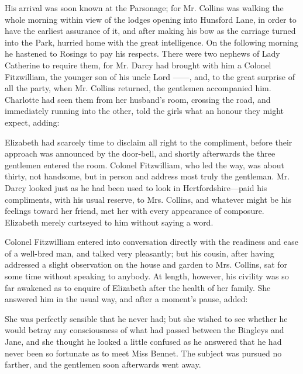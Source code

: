 His arrival was soon known at the Parsonage; for Mr. Collins was walking the whole morning within view of the lodges opening into Hunsford Lane, in order to have the earliest assurance of it, and after making his bow as the carriage turned into the Park, hurried home with the great intelligence. On the following morning he hastened to Rosings to pay his respects. There were two nephews of Lady Catherine to require them, for Mr. Darcy had brought with him a Colonel Fitzwilliam, the younger son of his uncle Lord ------, and, to the great surprise of all the party, when Mr. Collins returned, the gentlemen accompanied him. Charlotte had seen them from her husband's room, crossing the road, and immediately running into the other, told the girls what an honour they might expect, adding:


Elizabeth had scarcely time to disclaim all right to the compliment, before their approach was announced by the door-bell, and shortly afterwards the three gentlemen entered the room. Colonel Fitzwilliam, who led the way, was about thirty, not handsome, but in person and address most truly the gentleman. Mr. Darcy looked just as he had been used to look in Hertfordshire---paid his compliments, with his usual reserve, to Mrs. Collins, and whatever might be his feelings toward her friend, met her with every appearance of composure. Elizabeth merely curtseyed to him without saying a word.

Colonel Fitzwilliam entered into conversation directly with the readiness and ease of a well-bred man, and talked very pleasantly; but his cousin, after having addressed a slight observation on the house and garden to Mrs. Collins, sat for some time without speaking to anybody. At length, however, his civility was so far awakened as to enquire of Elizabeth after the health of her family. She answered him in the usual way, and after a moment's pause, added:


She was perfectly sensible that he never had; but she wished to see whether he would betray any consciousness of what had passed between the Bingleys and Jane, and she thought he looked a little confused as he answered that he had never been so fortunate as to meet Miss Bennet. The subject was pursued no farther, and the gentlemen soon afterwards went away.

